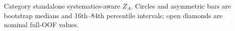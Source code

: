 Category standalone systematics-aware $Z_A$. Circles and asymmetric bars are bootstrap medians and 16th--84th percentile intervals; open diamonds are nominal full-OOF values.
